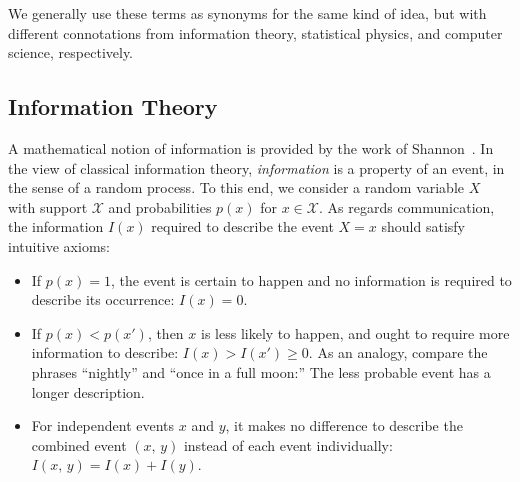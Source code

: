 \documentclass[aps,reprint,floatfix]{revtex4-2}
\theoremstyle{plain}
\theoremstyle{definition}
\renewcommand\geq\geqslant%
\begin{document}
We generally use these terms as synonyms for the same kind of idea, but with
different connotations from information theory, statistical physics, and
computer science, respectively.

\subsection{Information Theory}\label{sec:information-theory}

A mathematical notion of information is provided by the work of
Shannon~\cite{shannon1948mathematical}. In the view of classical information
theory, \emph{information} is a property of an event, in the sense of a random
process. To this end, we consider a random variable $X$ with support
$\mathcal{X}$ and probabilities $p(x)$ for $x \in \mathcal{X}$. As regards
communication, the information $I(x)$ required to describe the event $X = x$
should satisfy intuitive axioms:
\begin{itemize}
  \item If $p(x) = 1$, the event is certain to happen and no information is
    required to describe its occurrence: $I(x) = 0$.
  \item If $p(x) < p(x')$, then $x$ is less likely to happen, and ought to
    require more information to describe: $I(x) > I(x') \geq 0$. As an analogy,
    compare the phrases ``nightly'' and ``once in a full moon:'' The less
    probable event has a longer description.
  \item For independent events $x$ and $y$, it makes no difference to describe
    the combined event $(x,\, y)$ instead of each event individually: $I(x,\, y)
    = I(x) + I(y)$.
\end{itemize}
\end{document}
